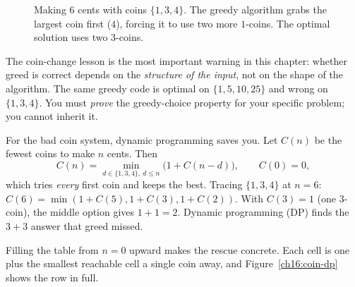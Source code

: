 \begin{figure}[htbp]
\centering
{}
\caption{Making $6$ cents with coins $\{1, 3, 4\}$. The greedy algorithm grabs the largest coin first ($4$), forcing it to use two more $1$-coins. The optimal solution uses two $3$-coins.}
\label{ch16:fig-coin-counterexample}
\end{figure}

\begin{trapbox}
The coin-change lesson is the most important warning in this chapter: whether
greed is correct depends on the \emph{structure of the input}, not on the shape
of the algorithm. The same greedy code is optimal on $\{1,5,10,25\}$ and wrong on
$\{1,3,4\}$. You must \emph{prove} the greedy-choice property for your specific
problem; you cannot inherit it.
\end{trapbox}

For the bad coin system, dynamic programming saves you. Let $C(n)$ be the fewest
coins to make $n$ cents. Then
\[
  C(n) = \min_{d \in \{1,3,4\},\ d \le n} \bigl(1 + C(n-d)\bigr), \qquad C(0)=0,
\]
which tries \emph{every} first coin and keeps the best. Tracing $\{1,3,4\}$ at $n=6$: $C(6) = \min(1+C(5),
1+C(3), 1+C(2))$. With $C(3)=1$ (one $3$-coin), the middle option gives $1+1=2$.
Dynamic programming (DP) finds the $3+3$ answer that greed missed.

Filling the table from $n=0$ upward makes the rescue concrete. Each cell is one
plus the smallest reachable cell a single coin away, and
Figure~\ref{ch16:coin-dp} shows the row in full.

